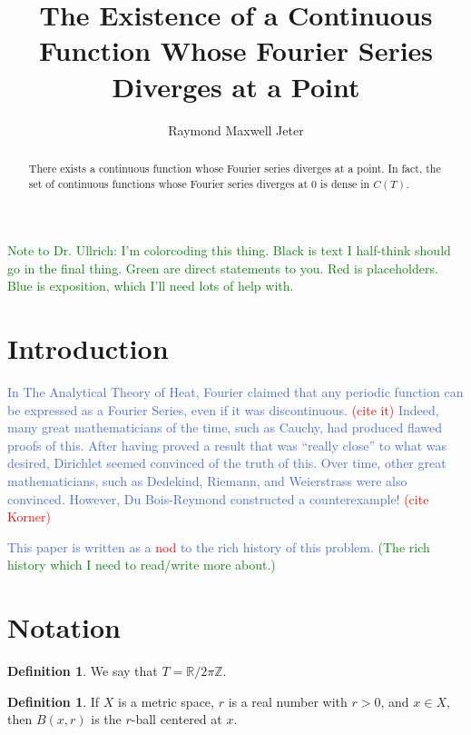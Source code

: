 \documentclass{amsart}
\newcommand{\R}{\mathbb{R}}
\newcommand{\Z}{\mathbb{Z}}
\newcommand{\colorcomment}[2]{\textcolor{#1}{#2}} %
\theoremstyle{definition}
\newtheorem{definition}[thm]{Definition}
\begin{document}
\title{The Existence of a Continuous Function Whose Fourier Series Diverges at a Point}
\author{Raymond Maxwell Jeter}

\begin{abstract}
There exists a continuous function whose Fourier series diverges at a point. 
In fact, the set of continuous functions whose Fourier series diverges at $0$ is dense in $C(T)$.
\end{abstract}

\maketitle

\colorcomment{Green}{Note to Dr. Ullrich: I'm colorcoding this thing. Black is text I half-think should go in the final thing. Green are direct statements to you. Red is placeholders. Blue is exposition, which I'll need lots of help with.}

\section{Introduction}

\colorcomment{RoyalBlue}{In The Analytical Theory of Heat, Fourier claimed that any periodic function can be expressed as a Fourier Series, even if it was discontinuous. \colorcomment{red}{(cite it)}
Indeed, many great mathematicians of the time, such as Cauchy, had produced flawed proofs of this. 
After having proved a result that was ``really close'' to what was desired, Dirichlet seemed convinced of the truth of this. 
Over time, other great mathematicians, such as Dedekind, Riemann, and Weierstrass were also convinced. 
However, Du Bois-Reymond constructed a counterexample! \colorcomment{red}{(cite Korner)}}

\colorcomment{RoyalBlue}{This paper is written as a \colorcomment{red}{nod} to the rich history of this problem.}
\colorcomment{Green}{(The rich history which I need to read/write more about.)}

\section{Notation}

\begin{definition}
We say that $T = \R / 2\pi \Z$.
\end{definition}

\begin{definition}
If $X$ is a metric space, $r$ is a real number with $r>0$, and $x \in X$, then $B(x,r)$ is the $r$-ball centered at $x$.
\end{definition}
\end{document}
